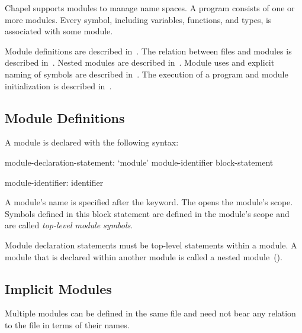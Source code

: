 \label{Modules}


Chapel supports modules to manage name spaces.  A program consists of
one or more modules.  Every symbol, including variables, functions,
and types, is associated with some module.

Module definitions are described in~.  The
relation between files and modules is described
in~.  Nested modules are described
in~.  Module uses and explicit naming of symbols
are described in~.  The execution of a program and
module initialization is described in~.

\subsection{Module Definitions}
\label{Module_Definitions}


A module is declared with the following syntax:
\begin{syntax}
module-declaration-statement:
  `module' module-identifier block-statement

module-identifier:
  identifier
\end{syntax}

A module's name is specified after the  keyword.
The  opens the module's scope.  Symbols defined
in this block statement are defined in the module's scope and are
called \emph{top-level module symbols}.

Module declaration statements must be top-level statements within a
module.  A module that is declared within another module is called a
nested module~().

\subsection{Implicit Modules}
\label{Implicit_Modules}

Multiple modules can be defined in the same file and need not bear any
relation to the file in terms of their names.

